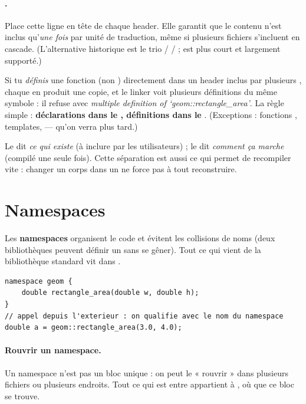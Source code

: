 \documentclass[11pt]{article}
\begin{document}
\paragraph{.} Place cette ligne en tête de chaque header.
Elle garantit que le contenu n'est inclus qu'\emph{une fois} par unité de
traduction, même si plusieurs fichiers s'incluent en cascade. (L'alternative
historique est le trio  /  /  ;
 est plus court et largement supporté.)

\begin{piege}
Si tu \emph{définis} une fonction (non ) directement dans un header
inclus par plusieurs , chaque  en produit une copie, et le
linker voit plusieurs définitions du même symbole : il refuse avec
\emph{multiple definition of `geom::rectangle\_area'}. La règle simple :
\textbf{déclarations dans le , définitions dans le }.
(Exceptions : fonctions , templates,  — qu'on verra
plus tard.)
\end{piege}

\begin{aretenir}
Le  dit \emph{ce qui existe} (à inclure par les utilisateurs) ; le
 dit \emph{comment ça marche} (compilé une seule fois). Cette
séparation est aussi ce qui permet de recompiler vite : changer un corps dans un
 ne force pas à tout reconstruire.
\end{aretenir}

\section{Namespaces}

Les \textbf{namespaces} organisent le code et évitent les collisions de noms
(deux bibliothèques peuvent définir un  sans se gêner). Tout ce qui
vient de la bibliothèque standard vit dans .

\begin{lstlisting}
namespace geom {
    double rectangle_area(double w, double h);
}
// appel depuis l'exterieur : on qualifie avec le nom du namespace
double a = geom::rectangle_area(3.0, 4.0);
\end{lstlisting}

\paragraph{Rouvrir un namespace.} Un namespace n'est pas un bloc unique : on
peut le « rouvrir » dans plusieurs fichiers ou plusieurs endroits. Tout ce qui
est entre  appartient à , où que ce
bloc se trouve.
\end{document}
